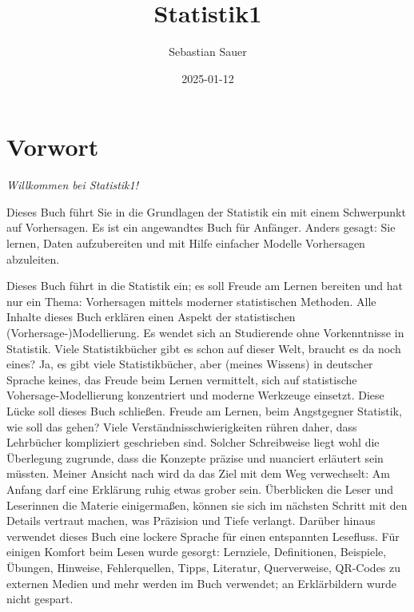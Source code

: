 \documentclass[
  letterpaper,
]{scrbook}
\title{Statistik1}
\author{Sebastian Sauer}
\date{2025-01-12}
\renewcommand*\contentsname{Inhaltsverzeichnis}
\newcommand\contentsname{Inhaltsverzeichnis}
\theoremstyle{definition}
\theoremstyle{definition}
\theoremstyle{definition}
\theoremstyle{remark}
\begin{document}
\frontmatter
\maketitle

\renewcommand*\contentsname{Inhaltsverzeichnis}
{
\setcounter{tocdepth}{1}
\tableofcontents
}

\mainmatter
{}

\chapter*{Vorwort}\label{vorwort}


\emph{Willkommen bei Statistik1!}

Dieses Buch führt Sie in die Grundlagen der Statistik ein mit einem
Schwerpunkt auf Vorhersagen. Es ist ein angewandtes Buch für Anfänger.
Anders gesagt: Sie lernen, Daten aufzubereiten und mit Hilfe einfacher
Modelle Vorhersagen abzuleiten.

Dieses Buch führt in die Statistik ein; es soll Freude am Lernen
bereiten und hat nur ein Thema: Vorhersagen mittels moderner
statistischen Methoden. Alle Inhalte dieses Buch erklären einen Aspekt
der statistischen (Vorhersage-)Modellierung. Es wendet sich an
Studierende ohne Vorkenntnisse in Statistik. Viele Statistikbücher gibt
es schon auf dieser Welt, braucht es da noch eines? Ja, es gibt viele
Statistikbücher, aber (meines Wissens) in deutscher Sprache keines, das
Freude beim Lernen vermittelt, sich auf statistische
Vohersage-Modellierung konzentriert und moderne Werkzeuge einsetzt.
Diese Lücke soll dieses Buch schließen. Freude am Lernen, beim
Angstgegner Statistik, wie soll das gehen? Viele
Verständnisschwierigkeiten rühren daher, dass Lehrbücher kompliziert
geschrieben sind. Solcher Schreibweise liegt wohl die Überlegung
zugrunde, dass die Konzepte präzise und nuanciert erläutert sein
müssten. Meiner Ansicht nach wird da das Ziel mit dem Weg verwechselt:
Am Anfang darf eine Erklärung ruhig etwas grober sein. Überblicken die
Leser und Leserinnen die Materie einigermaßen, können sie sich im
nächsten Schritt mit den Details vertraut machen, was Präzision und
Tiefe verlangt. Darüber hinaus verwendet dieses Buch eine lockere
Sprache für einen entspannten Lesefluss. Für einigen Komfort beim Lesen
wurde gesorgt: Lernziele, Definitionen, Beispiele, Übungen, Hinweise,
Fehlerquellen, Tipps, Literatur, Querverweise, QR-Codes zu externen
Medien und mehr werden im Buch verwendet; an Erklärbildern wurde nicht
gespart.
\end{document}
